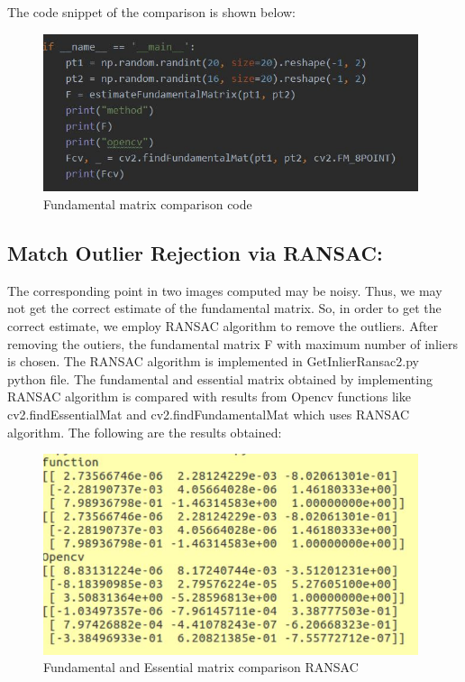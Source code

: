 \documentclass[12pt]{article}
\begin{document}
\newline
The code snippet of the comparison is shown below:
\newpage
\begin{figure}[h]
    \centering
    \includegraphics[width=11cm]{funcode}
    \caption{Fundamental matrix comparison code}
    \label{fig:Fundamental matrix comparison code}
\end{figure}
\subsection{Match Outlier Rejection via RANSAC:}
The corresponding point in two images computed may be noisy. Thus, we may not get the correct estimate of the fundamental matrix. So, in order to get the correct estimate, we employ RANSAC algorithm to remove the outliers. After removing the outiers, the fundamental matrix F with maximum number of inliers is chosen. The RANSAC algorithm is implemented in GetInlierRansac2.py python file. The fundamental and essential matrix obtained by implementing RANSAC algorithm is compared with results from Opencv functions like  cv2.findEssentialMat and cv2.findFundamentalMat which uses RANSAC algorithm. The following are the results obtained:
\begin{figure}[h]
    \centering
    \includegraphics[width=11cm]{ransac}
    \caption{Fundamental and Essential matrix comparison RANSAC}
    \label{fig:Fundamental and Essential matrix comparison RANSAC}
\end{figure}
\newline 
\end{document}
